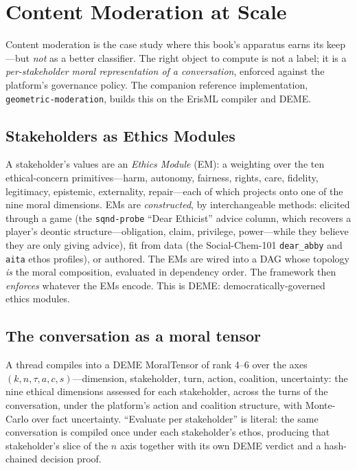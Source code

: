 \documentclass[12pt,letterpaper,twoside,openright]{book}
\theoremstyle{plain}
\theoremstyle{definition}
\theoremstyle{remark}
\begin{document}
\section{Content Moderation at Scale}

Content moderation is the case study where this book's apparatus earns its keep---but \emph{not} as a better classifier. The right object to compute is not a label; it is a \emph{per-stakeholder moral representation of a conversation}, enforced against the platform's governance policy. The companion reference implementation, \texttt{geometric-moderation}, builds this on the ErisML compiler and DEME.

\subsection{Stakeholders as Ethics Modules}
A stakeholder's values are an \emph{Ethics Module} (EM): a weighting over the ten ethical-concern primitives---harm, autonomy, fairness, rights, care, fidelity, legitimacy, epistemic, externality, repair---each of which projects onto one of the nine moral dimensions. EMs are \emph{constructed}, by interchangeable methods: elicited through a game (the \texttt{sqnd-probe} ``Dear Ethicist'' advice column, which recovers a player's deontic structure---obligation, claim, privilege, power---while they believe they are only giving advice), fit from data (the Social-Chem-101 \texttt{dear\_abby} and \texttt{aita} ethos profiles), or authored. The EMs are wired into a DAG whose topology \emph{is} the moral composition, evaluated in dependency order. The framework then \emph{enforces} whatever the EMs encode. This is DEME: democratically-governed ethics modules.

\subsection{The conversation as a moral tensor}
A thread compiles into a DEME MoralTensor of rank 4--6 over the axes $(k, n, \tau, a, c, s)$---dimension, stakeholder, turn, action, coalition, uncertainty: the nine ethical dimensions assessed for each stakeholder, across the turns of the conversation, under the platform's action and coalition structure, with Monte-Carlo over fact uncertainty. ``Evaluate per stakeholder'' is literal: the same conversation is compiled once under each stakeholder's ethos, producing that stakeholder's slice of the $n$ axis together with its own DEME verdict and a hash-chained decision proof.
\end{document}

